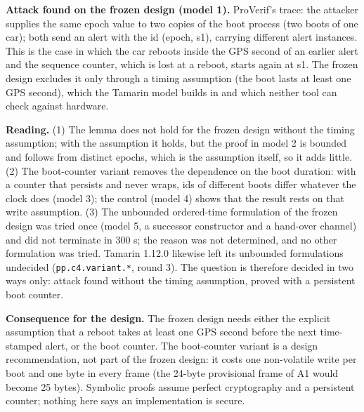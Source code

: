\textbf{Attack found on the frozen design (model 1).} ProVerif's trace: the attacker supplies the same epoch value to two copies of the boot process (two boots of one car); both send an alert with the id (epoch, s1), carrying different alert instances. This is the case in which the car reboots inside the GPS second of an earlier alert and the sequence counter, which is lost at a reboot, starts again at s1. The frozen design excludes it only through a timing assumption (the boot lasts at least one GPS second), which the Tamarin model builds in and which neither tool can check against hardware.

\textbf{Reading.} (1) The lemma does not hold for the frozen design without the timing assumption; with the assumption it holds, but the proof in model 2 is bounded and follows from distinct epochs, which is the assumption itself, so it adds little. (2) The boot-counter variant removes the dependence on the boot duration: with a counter that persists and never wraps, ids of different boots differ whatever the clock does (model 3); the control (model 4) shows that the result rests on that write assumption. (3) The unbounded ordered-time formulation of the frozen design was tried once (model 5, a successor constructor and a hand-over channel) and did not terminate in 300 s; the reason was not determined, and no other formulation was tried. Tamarin 1.12.0 likewise left its unbounded formulations undecided (\texttt{pp.c4.variant.*}, round 3). The question is therefore decided in two ways only: attack found without the timing assumption, proved with a persistent boot counter.

\textbf{Consequence for the design.} The frozen design needs either the explicit assumption that a reboot takes at least one GPS second before the next time-stamped alert, or the boot counter. The boot-counter variant is a design recommendation, not part of the frozen design: it costs one non-volatile write per boot and one byte in every frame (the 24-byte provisional frame of A1 would become 25 bytes). Symbolic proofs assume perfect cryptography and a persistent counter; nothing here says an implementation is secure.

